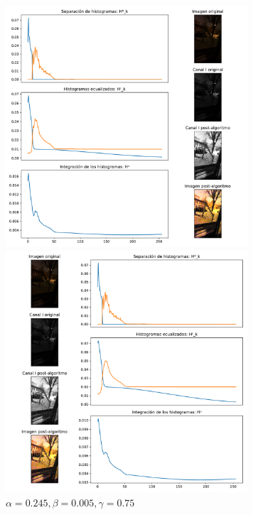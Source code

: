 \begin{figure}[H]
\begin{minipage}[c]{0.48\linewidth}
  \includegraphics[height=9cm]{imgs/porch-495-005-5.pdf}
  \caption{$\alpha = 0.495, \beta = 0.005, \gamma = 0.5$}
\end{minipage}
\hfill
\begin{minipage}[c]{0.48\linewidth}
  \includegraphics[height=9cm]{imgs/porch-245-005-75.pdf}
  \caption{$\alpha = 0.245, \beta = 0.005, \gamma = 0.75$}
\end{minipage}%
\end{figure}

